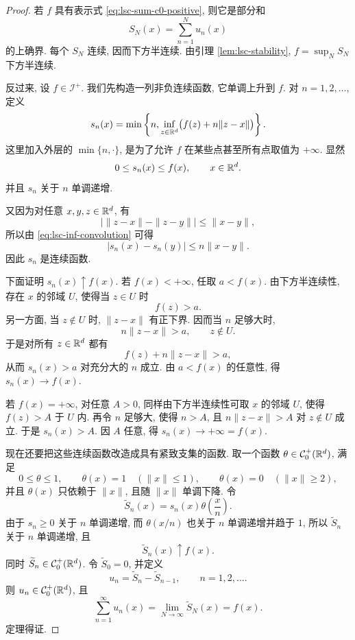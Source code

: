 \begin{proof}
	若 \(f\) 具有表示式 \eqref{eq:lsc-sum-c0-positive}, 则它是部分和
	\[
	S_N(x)=\sum_{n=1}^{N}u_n(x)
	\]
	的上确界. 每个 \(S_N\) 连续, 因而下方半连续. 由引理 \ref{lem:lsc-stability}, \(f=\sup_N S_N\) 下方半连续.
	
	反过来, 设 \(f\in\mathcal I^+\). 我们先构造一列非负连续函数, 它单调上升到 \(f\). 对 \(n=1,2,\ldots\), 定义
	\begin{equation}
		s_n(x)=\min\left\{n,\inf_{z\in\mathbb{R}^d}\bigl(f(z)+n\|z-x\|\bigr)\right\}.
		\label{eq:lsc-inf-convolution}
	\end{equation}
	这里加入外层的 \(\min\{n,\cdot\}\), 是为了允许 \(f\) 在某些点甚至所有点取值为 \(+\infty\). 显然
	\[
	0\leq s_n(x)\leq f(x),
	\qquad x\in\mathbb{R}^d.
	\]
	并且 \(s_n\) 关于 \(n\) 单调递增.
	
	又因为对任意 \(x,y,z\in\mathbb{R}^d\), 有
	\[
	\bigl|\|z-x\|-\|z-y\|\bigr|\leq \|x-y\|,
	\]
	所以由 \eqref{eq:lsc-inf-convolution} 可得
	\[
	|s_n(x)-s_n(y)|\leq n\|x-y\|.
	\]
	因此 \(s_n\) 是连续函数.
	
	下面证明 \(s_n(x)\uparrow f(x)\). 若 \(f(x)<+\infty\), 任取 \(a<f(x)\). 由下方半连续性, 存在 \(x\) 的邻域 \(U\), 使得当 \(z\in U\) 时
	\[
	f(z)>a.
	\]
	另一方面, 当 \(z\notin U\) 时, \(\|z-x\|\) 有正下界. 因而当 \(n\) 足够大时,
	\[
	n\|z-x\|>a,
	\qquad z\notin U.
	\]
	于是对所有 \(z\in\mathbb{R}^d\) 都有
	\[
	f(z)+n\|z-x\|>a,
	\]
	从而 \(s_n(x)>a\) 对充分大的 \(n\) 成立. 由 \(a<f(x)\) 的任意性, 得 \(s_n(x)\to f(x)\).
	
	若 \(f(x)=+\infty\), 对任意 \(A>0\), 同样由下方半连续性可取 \(x\) 的邻域 \(U\), 使得 \(f(z)>A\) 于 \(U\) 内. 再令 \(n\) 足够大, 使得 \(n>A\), 且 \(n\|z-x\|>A\) 对 \(z\notin U\) 成立. 于是 \(s_n(x)>A\). 因 \(A\) 任意, 得 \(s_n(x)\to+\infty=f(x)\).
	
	现在还要把这些连续函数改造成具有紧致支集的函数. 取一个函数 \(\theta\in\mathcal{C}_0^+(\mathbb{R}^d)\), 满足
	\[
	0\leq\theta\leq1,
	\qquad
	\theta(x)=1\quad (\|x\|\leq1),
	\qquad
	\theta(x)=0\quad (\|x\|\geq2),
	\]
	并且 \(\theta(x)\) 只依赖于 \(\|x\|\), 且随 \(\|x\|\) 单调下降. 令
	\[
	\widetilde S_n(x)=s_n(x)\theta\left(\frac{x}{n}\right).
	\]
	由于 \(s_n\geq0\) 关于 \(n\) 单调递增, 而 \(\theta(x/n)\) 也关于 \(n\) 单调递增并趋于 \(1\), 所以 \(\widetilde S_n\) 关于 \(n\) 单调递增, 且
	\[
	\widetilde S_n(x)\uparrow f(x).
	\]
	同时 \(\widetilde S_n\in\mathcal{C}_0^+(\mathbb{R}^d)\). 令 \(\widetilde S_0=0\), 并定义
	\[
	u_n=\widetilde S_n-\widetilde S_{n-1},
	\qquad n=1,2,\ldots.
	\]
	则 \(u_n\in\mathcal{C}_0^+(\mathbb{R}^d)\), 且
	\[
	\sum_{n=1}^{\infty}u_n(x)
	=
	\lim_{N\to\infty}\widetilde S_N(x)
	=f(x).
	\]
	定理得证.
\end{proof}

